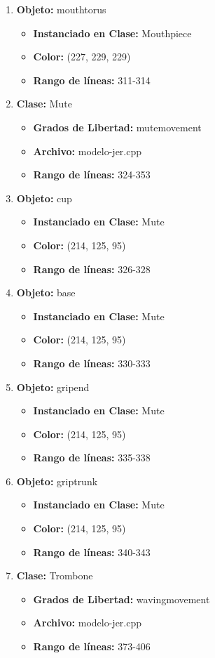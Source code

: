 \documentclass[10pt, a4paper]{article}
\begin{document}
\begin{enumerate}
\begin{itemize}
	\end{itemize}
	\item \textbf{Objeto:} mouthtorus
	\begin{itemize}
		\item \textbf{Instanciado en Clase:} Mouthpiece
		\item \textbf{Color:} (227, 229, 229)
		\item \textbf{Rango de líneas:} 311-314
	\end{itemize}
	\item \textbf{Clase:} Mute
	\begin{itemize}
		\item \textbf{Grados de Libertad:} mutemovement
		\item \textbf{Archivo:} modelo-jer.cpp
		\item \textbf{Rango de líneas:} 324-353
	\end{itemize}
	\item \textbf{Objeto:} cup
	\begin{itemize}
		\item \textbf{Instanciado en Clase:} Mute
		\item \textbf{Color:} (214, 125, 95)
		\item \textbf{Rango de líneas:} 326-328
	\end{itemize}
	\item \textbf{Objeto:} base
	\begin{itemize}
		\item \textbf{Instanciado en Clase:} Mute
		\item \textbf{Color:} (214, 125, 95)
		\item \textbf{Rango de líneas:} 330-333
	\end{itemize}
	\item \textbf{Objeto:} gripend
	\begin{itemize}
		\item \textbf{Instanciado en Clase:} Mute
		\item \textbf{Color:} (214, 125, 95)
		\item \textbf{Rango de líneas:} 335-338
	\end{itemize}
	\item \textbf{Objeto:} griptrunk 
	\begin{itemize}
		\item \textbf{Instanciado en Clase:} Mute
		\item \textbf{Color:} (214, 125, 95)
		\item \textbf{Rango de líneas:} 340-343
	\end{itemize}
	\item \textbf{Clase:} Trombone
	\begin{itemize}
		\item \textbf{Grados de Libertad:} wavingmovement
		\item \textbf{Archivo:} modelo-jer.cpp
		\item \textbf{Rango de líneas:} 373-406
	\end{itemize}
\end{enumerate}
\end{document}
